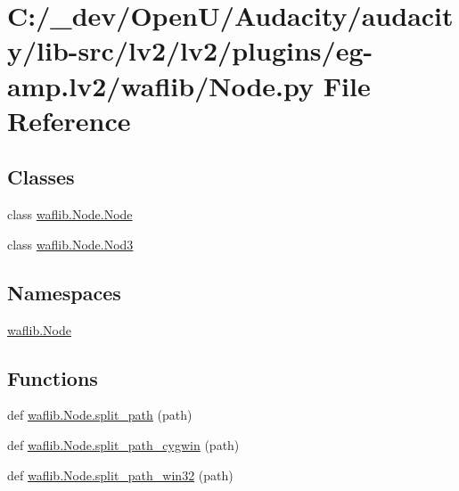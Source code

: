 \hypertarget{lv2_2plugins_2eg-amp_8lv2_2waflib_2_node_8py}{}\section{C\+:/\+\_\+dev/\+Open\+U/\+Audacity/audacity/lib-\/src/lv2/lv2/plugins/eg-\/amp.lv2/waflib/\+Node.py File Reference}
\label{lv2_2plugins_2eg-amp_8lv2_2waflib_2_node_8py}
\subsection*{Classes}
\begin{DoxyCompactItemize}
\item 
class \hyperlink{classwaflib_1_1_node_1_1_node}{waflib.\+Node.\+Node}
\item 
class \hyperlink{classwaflib_1_1_node_1_1_nod3}{waflib.\+Node.\+Nod3}
\end{DoxyCompactItemize}
\subsection*{Namespaces}
\begin{DoxyCompactItemize}
\item 
 \hyperlink{namespacewaflib_1_1_node}{waflib.\+Node}
\end{DoxyCompactItemize}
\subsection*{Functions}
\begin{DoxyCompactItemize}
\item 
def \hyperlink{namespacewaflib_1_1_node_ae580a314d04691a283552a4712b56a84}{waflib.\+Node.\+split\+\_\+path} (path)
\item 
def \hyperlink{namespacewaflib_1_1_node_a089fc378e3863231aab10b6892a9bc2b}{waflib.\+Node.\+split\+\_\+path\+\_\+cygwin} (path)
\item 
def \hyperlink{namespacewaflib_1_1_node_a20acd7540bbb7886232accfe0a2a4219}{waflib.\+Node.\+split\+\_\+path\+\_\+win32} (path)
\end{DoxyCompactItemize}
